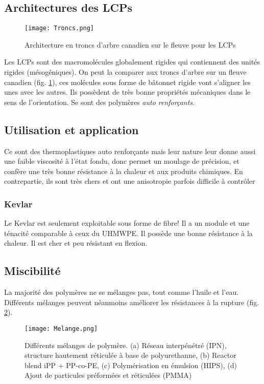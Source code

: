 \documentclass[../main.tex]{subfiles}
\begin{document}
	\subsection{Architectures des LCPs}
	\begin{figure}
		\begin{center}
			\texttt{[image: Troncs.png]}
			\caption{\label{LCP} Architecture en troncs d'arbre canadien sur le fleuve pour les LCPs}
		\end{center}
	
	\end{figure}
	Les LCPs sont des macromolécules globalement rigides qui contiennent des unités rigides (mésogéniques). On peut la comparer aux troncs d'arbre sur un fleuve canadien (fig. \ref{LCP}), ces molécules sous forme de bâtonnet rigide vont s'aligner les unes avec les autres. Ils possèdent de très bonne propriétés mécaniques dans le sens de l'orientation. Se sont des polymères \textit{auto renforçants}.
	\subsection{Utilisation et application}
	Ce sont des thermoplastiques auto renforçants mais leur nature leur donne aussi une faible viscosité à l'état fondu, donc permet un moulage de précision, et confère une très bonne résistance à la chaleur et aux produits chimiques. En contrepartie, ils sont très chers et ont une anisotropie parfois difficile à contrôler
	\subsubsection{Kevlar}
	Le Kevlar est seulement exploitable sous forme de fibre! Il a un module et une ténacité comparable à ceux du UHMWPE. Il possède une bonne résistance à la chaleur. Il est cher et peu résistant en flexion.
	\subsection{Miscibilité}
	La majorité des polymères ne se mélanges pas, tout comme l'huile et l'eau. Différents mélanges peuvent néanmoins améliorer les résistances à la rupture (fig. \ref{melange}).
	\begin{figure}
		\begin{center}
			\texttt{[image: Melange.png]}
			\caption{\label{melange}Différents mélanges de polymère. (a) Réseau interpénétré (IPN), structure hautement réticulée à base de polyurethanne, (b) Reactor blend iPP + PP-co-PE, (c) Polymérisation en émulsion (HIPS), (d) Ajout de particules préformées et réticulées (PMMA)}
		\end{center}
	\end{figure}
\end{document}
